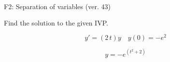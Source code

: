 \begin{exercise}
  \begin{exerciseTitle}F2: Separation of variables (ver. 43)\end{exerciseTitle}
  \begin{exerciseStatement}
    
Find the solution to the given IVP.

    
\[y'=( 2 \, t )y\hspace{1em} y(0)= -e^{2}\]

  \end{exerciseStatement}
  \begin{exerciseAnswer}
    
\[y= -e^{\left(t^{2} + 2\right)}\]

  \end{exerciseAnswer}
\end{exercise}
